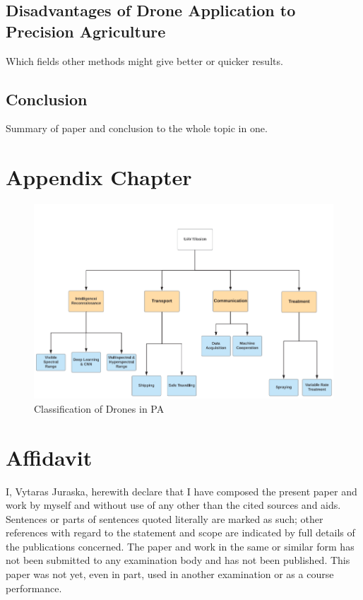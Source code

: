 \documentclass[11pt,a5paper,footinclude=true,headinclude=true, oneside]{scrbook}
\begin{document}
\section{Disadvantages of Drone Application to Precision Agriculture}

    Which fields other methods might give better or quicker results.

\section{Conclusion}
    Summary of paper and conclusion to the whole topic in one.


\chapter{Appendix Chapter}
    
\begin{figure}[htbp]
\centerline{\includegraphics[scale=.5]{Drone_Groups.png}}
\caption{Classification of Drones in PA \cite{Bacco_Smart_2018}}
\label{rein3}
\end{figure}


\chapter{Affidavit}
I, Vytaras Juraska, herewith declare that I have composed the present paper and work by myself and without use of any other than the cited sources and aids. Sentences or parts of sentences quoted literally are marked as such; other references with regard to the statement and scope are indicated by full details of the publications concerned. The paper and work in the same or similar form has not been submitted to any examination body and has not been published. This paper was not yet, even in part, used in another examination or as a course performance.
\end{document}
